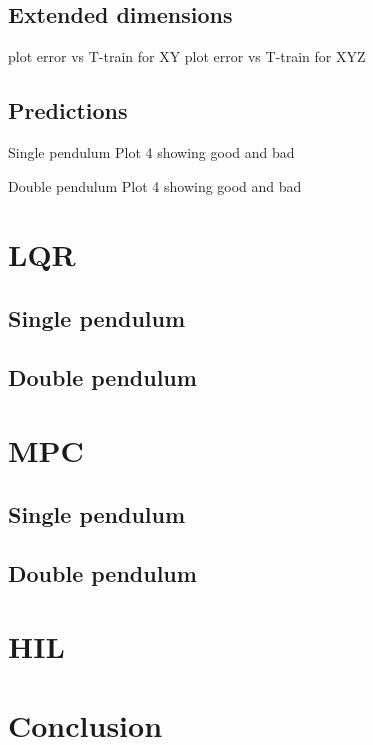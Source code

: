         \subsection{Extended dimensions}
            plot error vs T-train for  XY
            plot error vs T-train for  XYZ

        \subsection{Predictions}
            Single pendulum
            Plot 4 showing good and bad

            Double pendulum
            Plot 4 showing good and bad

    \section{LQR}
        \subsection{Single pendulum}
        \subsection{Double pendulum}

    \section{MPC}
        \subsection{Single pendulum}
        \subsection{Double pendulum}

    \section{HIL}

    \section{Conclusion}


